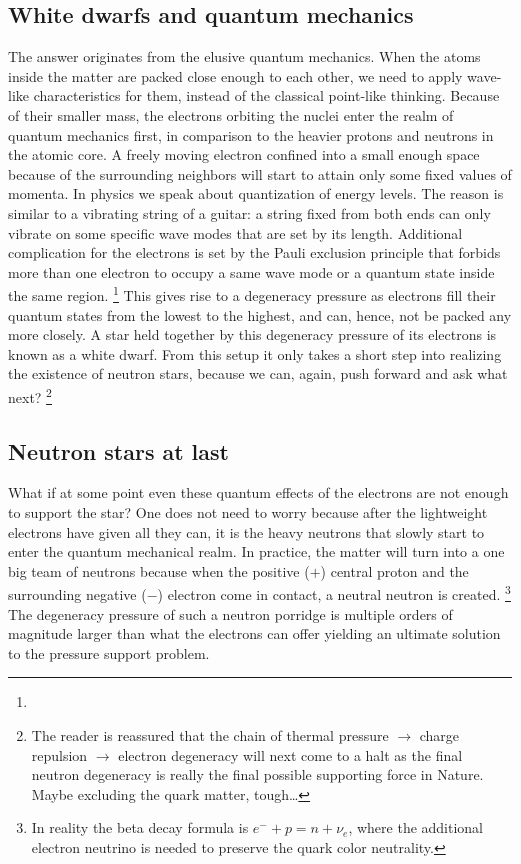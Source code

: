 \subsection{White dwarfs and quantum mechanics}
The answer originates from the elusive quantum mechanics.
When the atoms inside the matter are packed close enough to each other, we need to apply wave-like characteristics for them, instead of the classical point-like thinking.
Because of their smaller mass, the electrons orbiting the nuclei enter the realm of quantum mechanics first, in comparison to the heavier protons and neutrons in the atomic core.
A freely moving electron confined into a small enough space because of the surrounding neighbors will start to attain only some fixed values of momenta.
In physics we speak about quantization of energy levels.
The reason is similar to a vibrating string of a guitar: a string fixed from both ends can only vibrate on some specific wave modes that are set by its length.
Additional complication for the electrons is set by the Pauli exclusion principle that forbids more than one electron to occupy a same wave mode or a quantum state inside the same region.%
\footnote{}
This gives rise to a degeneracy pressure as electrons fill their quantum states from the lowest to the highest, and can, hence, not be packed any more closely.
A star held together by this degeneracy pressure of its electrons is known as a white dwarf.
From this setup it only takes a short step into realizing the existence of neutron stars, because we can, again, push forward and ask what next?%
\footnote{The reader is reassured that the chain of thermal pressure $\rightarrow$ charge repulsion $\rightarrow$ electron degeneracy will next come to a halt as the final neutron degeneracy is really the final possible supporting force in Nature. Maybe excluding the quark matter, tough\ldots}


\subsection{Neutron stars at last}
What if at some point even these quantum effects of the electrons are not enough to support the star?
One does not need to worry because after the lightweight electrons have given all they can, it is the heavy neutrons that slowly start to enter the quantum mechanical realm.
In practice, the matter will turn into a one big team of neutrons because when the positive ($+$) central proton and the surrounding negative ($-$) electron come in contact, a neutral neutron is created.%
\footnote{In reality the beta decay formula is $e^- + p = n + \nu_e$, where the additional electron neutrino is needed to preserve the quark color neutrality.}
The degeneracy pressure of such a neutron porridge is multiple orders of magnitude larger than what the electrons can offer yielding an ultimate solution to the pressure support problem.

